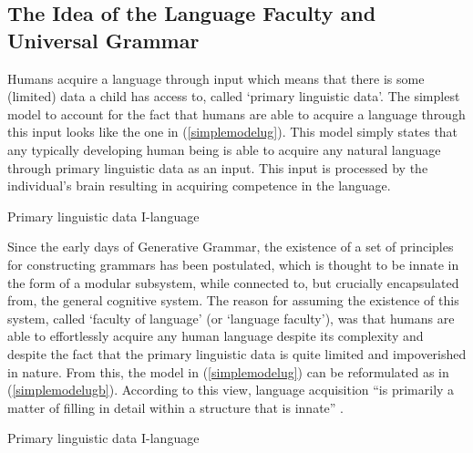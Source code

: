 \subsection{The Idea of the Language Faculty and Universal Grammar}
Humans acquire a language through input which means that there is some (limited) data a child has access to, called `primary linguistic data'. The simplest model to account for the fact that humans are able to acquire a language through this input looks like the one in (\ref{simplemodelug}). This model simply states that any typically developing human being is able to acquire any natural language through primary linguistic data as an input. This input is processed by the individual's brain resulting in acquiring competence in the language. 

\begin{exe}
\ex\label{simplemodelug} Primary linguistic data    I-language
\end{exe}

\noindent Since the early days of Generative Grammar, the existence of a set of principles for constructing grammars has been postulated, which is thought to be innate in the form of a modular subsystem, while connected to, but crucially encapsulated from, the general cognitive system. The reason for assuming the existence of this system, called `faculty of language' (or `language faculty'), was that humans are able to effortlessly acquire any human language despite its complexity and despite the fact that the primary linguistic data is quite limited and impoverished in nature. From this, the model in (\ref{simplemodelug}) can be reformulated as in (\ref{simplemodelugb}). According to this view, language acquisition ``is primarily a matter of filling in detail within a structure that is innate'' \citep[39]{chomsky1975reflections}.

\begin{exe}
\ex\label{simplemodelugb} Primary linguistic data    I-language
\end{exe}

